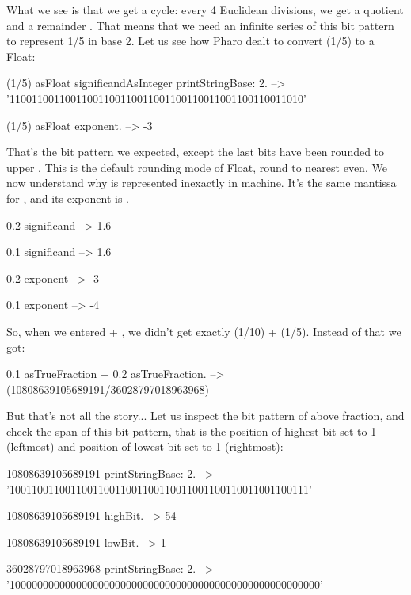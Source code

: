 \documentclass[a4paper,10pt,twoside]{book}
\begin{document}
What we see is that we get a cycle: every 4 Euclidean divisions, we get a quotient  and a remainder . That means that we need an infinite series of this bit pattern  to represent 1/5 in base 2. Let us see how Pharo dealt to convert (1/5) to a Float:


 \begin{code}{}
(1/5) asFloat significandAsInteger printStringBase: 2.
	--> '11001100110011001100110011001100110011001100110011010'
	
(1/5) asFloat exponent.
	--> -3
\end{code}

That's the bit pattern we expected, except the last bits  have been rounded to upper . This is the default rounding mode of Float, round to nearest even. We now understand why  is represented inexactly in machine. It's the same mantissa for , and its exponent is .

\begin{code}{} 
0.2 significand
 	--> 1.6
	
0.1 significand 
	--> 1.6	
	
0.2 exponent
	--> -3
	
0.1 exponent
	--> -4
\end{code}


So, when we entered  + , we didn't get exactly (1/10) + (1/5).
Instead of that we got:

 \begin{code}{}
0.1 asTrueFraction + 0.2 asTrueFraction.
	-->  (10808639105689191/36028797018963968)
\end{code}

But that's not all the story... Let us inspect the bit pattern of above fraction, and check the span of this bit pattern, that is the position of highest bit set to 1 (leftmost) and position of lowest bit set to 1 (rightmost):
 \begin{code}{}
10808639105689191 printStringBase: 2.
	-->  '100110011001100110011001100110011001100110011001100111'
	
10808639105689191 highBit.
	-->  54
	
10808639105689191 lowBit.
	-->  1

36028797018963968 printStringBase: 2.
	-->  '10000000000000000000000000000000000000000000000000000000'
\end{code}
\end{document}
